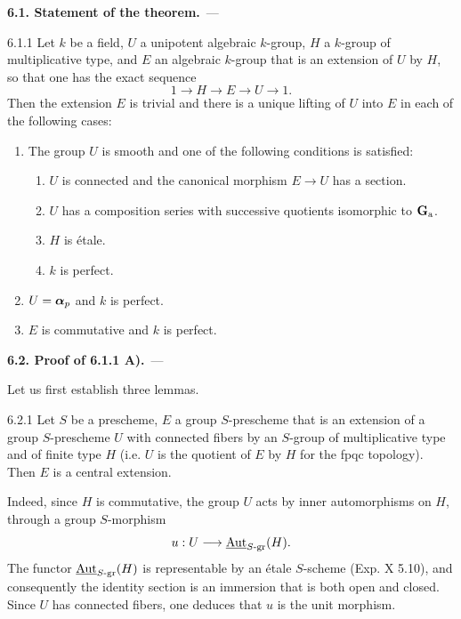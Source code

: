\par\medskip\noindent\textbf{6.1. Statement of the theorem.}\ ---\par\label{XVII.6.1}
\begin{theorem}{6.1.1}\label{XVII.6.1.1}
Let $k$ be a field, $U$ a unipotent algebraic $k$-group, $H$ a $k$-group of multiplicative type, and $E$ an algebraic $k$-group that is an extension of $U$ by $H$, so that one has the exact sequence
\[
 1\to H\to E\to U\to1.
\]
Then the extension $E$ is trivial and there is a unique lifting of $U$ into $E$ in each of the following cases:
\begin{enumerate}[label=\textup{\Alph*)}]
\item The group $U$ is smooth and one of the following conditions is satisfied:
\begin{enumerate}[label=\textup{\roman*)}]
\item $U$ is connected and the canonical morphism $E\to U$ has a section.
\item $U$ has a composition series with successive quotients isomorphic to $\mathbf{G}_{\mathrm{a}}$.
\item $H$ is étale.
\item $k$ is perfect.
\end{enumerate}
\item $U=\boldsymbol{\alpha}_p$ and $k$ is perfect.
\item $E$ is commutative and $k$ is perfect.
\end{enumerate}
\end{theorem}

\par\medskip\noindent\textbf{6.2. Proof of 6.1.1 A).}\ ---\par\label{XVII.6.2}
Let us first establish three lemmas.
\begin{lemma}{6.2.1}\label{XVII.6.2.1}
Let $S$ be a prescheme, $E$ a group $S$-prescheme that is an extension of a group $S$-prescheme $U$ with connected fibers by an $S$-group of multiplicative type and of finite type $H$ (i.e. $U$ is the quotient of $E$ by $H$ for the fpqc topology). Then $E$ is a central extension.
\end{lemma}
Indeed, since $H$ is commutative, the group $U$ acts by inner automorphisms on $H$, through a group $S$-morphism
\[
 u:U\longrightarrow\underline{\operatorname{Aut}}_{S\text{-gr}}(H).
\]
The functor $\underline{\operatorname{Aut}}_{S\text{-gr}}(H)$ is representable by an étale $S$-scheme (Exp. X 5.10), and consequently the identity section is an immersion that is both open and closed. Since $U$ has connected fibers, one deduces that $u$ is the unit morphism.

